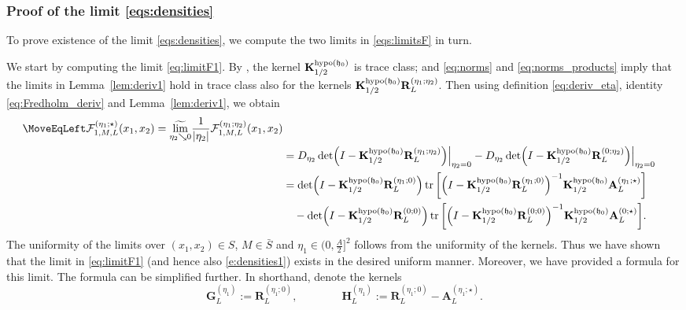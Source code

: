\documentclass[oneside,final,11pt]{amsart}
\theoremstyle{definition}
\newcommand{\fh}{\mathfrak{h}}
\newcommand{\mylim}[1]{\underset{#1}{\wt{\mathrm{lim}}}}
\newcommand{\dens}{\CF}
\newcommand{\1}[1]{\mathbf{1}_{#1}}
\newcommand{\wt}{\widetilde}
\newcommand{\uptext}[1]{\text{\upshape{#1}}}
\DeclareMathOperator{\hypo}{\uptext{hypo}}
\DeclareMathOperator{\tr}{\mathop{\uptext{tr}}}
\newcommand{\fA}{\mathbf{A}}
\newcommand{\fK}{\mathbf{K}}
\newcommand{\fR}{\mathbf{R}}
\newcommand{\fG}{\mathbf{G}}
\newcommand{\fH}{\mathbf{H}}
\newcommand{\CF}{\mathcal{F}}
\numberwithin{equation}{section}
\begin{document}
\subsubsection{Proof of the limit \eqref{eqs:densities}}
\label{ss:first_deriv}

To prove existence of the limit \eqref{eqs:densities}, we compute the two limits in \eqref{eqs:limitsF} in turn.

We start by computing the limit \eqref{eq:limitF1}. By \cite[Theorem~4.1]{fixedpt}, the kernel $\fK^{\hypo(\fh_0)}_{1/2}$ is trace class; and \eqref{eq:norms} and \eqref{eq:norms_products} imply that the limits in Lemma~\ref{lem:deriv1} hold in trace class also for the kernels $\fK^{\hypo(\fh_0)}_{1/2} \fR_L^{(\eta_1; \eta_2)}$. Then using definition \eqref{eq:deriv_eta},  identity \eqref{eq:Fredholm_deriv} and Lemma~\ref{lem:deriv1}, we obtain
\begin{equation}
\begin{split}
\MoveEqLeft
 \dens^{(\eta_1; \star)}_{1, M, L}(x_1, x_2) = \mylim{\eta_2 \searrow 0} \frac{1}{|\eta_2|} \dens^{(\eta_1; \eta_2)}_{1, M, L}(x_1, x_2) \\
 &= D_{\eta_2} \det\Bigl(I- \fK^{\hypo(\fh_0)}_{1/2} \fR_L^{(\eta_1; \eta_2)} \Bigr) \Bigr|_{\eta_2 = 0} - D_{\eta_2} \det \Bigl(I-\fK^{\hypo(\fh_0)}_{1/2} \fR_L^{(0;  \eta_2)}\Bigr) \Bigr|_{\eta_2 = 0} \\
&= \det \Bigl(I- \fK^{\hypo(\fh_0)}_{1/2} \fR_L^{(\eta_1; 0)} \Bigr) \tr\bigg[\Bigl(I - \fK^{\hypo(\fh_0)}_{1/2} \fR_L^{(\eta_1; 0)}\Bigr)^{-1} \fK^{\hypo(\fh_0)}_{1/2} \fA_L^{(\eta_1; \star)}\bigg]\\
&\quad - \det \Bigl(I- \fK^{\hypo(\fh_0)}_{1/2} \fR_L^{(0; 0)} \Bigr) \tr\bigg[\Bigl(I - \fK^{\hypo(\fh_0)}_{1/2} \fR_L^{(0; 0)}\Bigr)^{-1} \fK^{\hypo(\fh_0)}_{1/2} \fA_L^{(0; \star)}\bigg].
\end{split}
\label{e:det_d2}
\end{equation}
The uniformity of the limits over $(x_1, x_2) \in S$, $M \in \bar S$ and $\eta_1 \in (0,\frac{A}{2}]^2$ follows from the uniformity of the kernels.
Thus we have shown that the limit in \eqref{eq:limitF1} (and hence also \eqref{e:densities1}) exists in the desired uniform manner. Moreover, we have provided a formula for this limit.  The formula can be simplified further. In shorthand, denote the kernels
\begin{equation}\label{eq:kernels12}
\fG_L^{(\eta_1)} := \fR_L^{(\eta_1; 0)}, \qquad\qquad \fH_L^{(\eta_1)} := \fR_L^{(\eta_1; 0)} - \fA_L^{(\eta_1; \star)}.
\end{equation}
\end{document}
